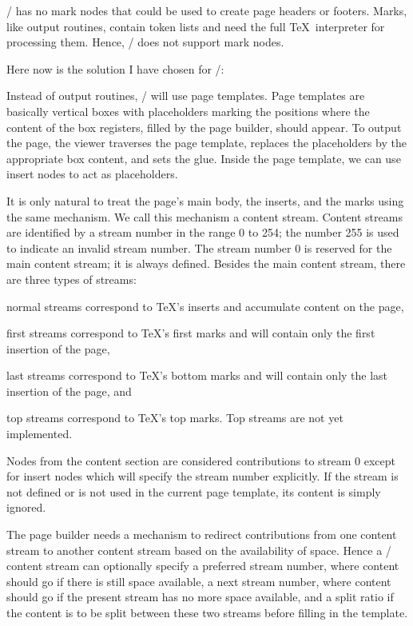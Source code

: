 \item
\HINT/ has no mark nodes that could be used to create page headers or footers.
Marks, like output routines, contain token lists and need the full \TeX\ interpreter
for processing them. Hence, \HINT/ does not support mark nodes.
\endenumerate

Here now is the solution I have chosen for \HINT/:

Instead of output routines, \HINT/ will use page templates.
Page templates are basically vertical boxes with placeholders marking the
positions where the content of the box registers, filled by the page builder,
should appear.
To output the page, the viewer traverses the page template,
replaces the placeholders by the appropriate box content, and
sets the glue. Inside the page template, we can use insert nodes to act
as placeholders.

It is only natural to treat the page's main body, the
inserts, and the marks using the same mechanism. We call this
mechanism a content stream.
Content streams are identified by a stream number in the range 0 to 254;
the number 255 is used to indicate an invalid stream number.
The stream number 0 is reserved for the main content stream; it is always defined.
Besides the main content stream, there are three types of streams:
\itemize
\item normal streams correspond to \TeX's inserts and accumulate content on the page,
\item first streams correspond to \TeX's first marks and will contain only the first insertion of the page,
\item last streams correspond to \TeX's bottom marks and will contain only the last insertion of the page, and
\item top streams correspond to \TeX's top marks. Top streams are not yet implemented.
\enditemize

Nodes from the content section are considered contributions to stream 0 except
for insert nodes which will specify the stream number explicitly.
If the stream is not defined or is not used in the current page template, its content is simply ignored.

The page builder needs a mechanism to redirect contributions from one content
stream to another content stream based on the availability of space.
Hence a \HINT/ content stream can optionally specify a preferred stream number,
where content should go if there is still space available, a next stream number,
where content should go if the present stream has no more space available, and
a split ratio if the content is to be split between these two streams before
filling in the template.

